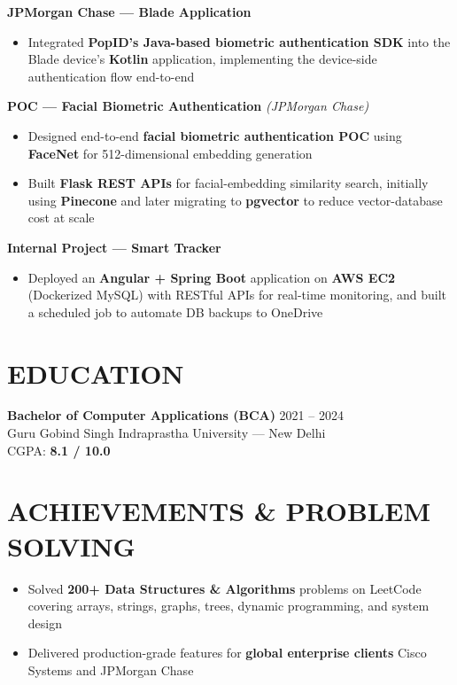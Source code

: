 \documentclass[a4paper,10.5pt]{article}
\begin{document}
\textbf{JPMorgan Chase — Blade Application}
\begin{itemize}
  \item Integrated \textbf{PopID's Java-based biometric authentication SDK} into the Blade device's \textbf{Kotlin} application, implementing the device-side authentication flow end-to-end
\end{itemize}

\textbf{POC — Facial Biometric Authentication} \textit{(JPMorgan Chase)}
\begin{itemize}
  \item Designed end-to-end \textbf{facial biometric authentication POC} using \textbf{FaceNet} for 512-dimensional embedding generation
  \item Built \textbf{Flask REST APIs} for facial-embedding similarity search, initially using \textbf{Pinecone} and later migrating to \textbf{pgvector} to reduce vector-database cost at scale
\end{itemize}

\textbf{Internal Project — Smart Tracker}
\begin{itemize}
  \item Deployed an \textbf{Angular + Spring Boot} application on \textbf{AWS EC2} (Dockerized MySQL) with RESTful APIs for real-time monitoring, and built a scheduled job to automate DB backups to OneDrive
\end{itemize}

\section*{EDUCATION}
\textbf{Bachelor of Computer Applications (BCA)} \hfill 2021 -- 2024\\
Guru Gobind Singh Indraprastha University — New Delhi\\
CGPA: \textbf{8.1 / 10.0}

\section*{ACHIEVEMENTS \& PROBLEM SOLVING}
\begin{itemize}
  \item Solved \textbf{200+ Data Structures \& Algorithms} problems on LeetCode covering arrays, strings, graphs, trees, dynamic programming, and system design
  \item Delivered production-grade features for \textbf{global enterprise clients} Cisco Systems and JPMorgan Chase
\end{itemize}
\end{document}
